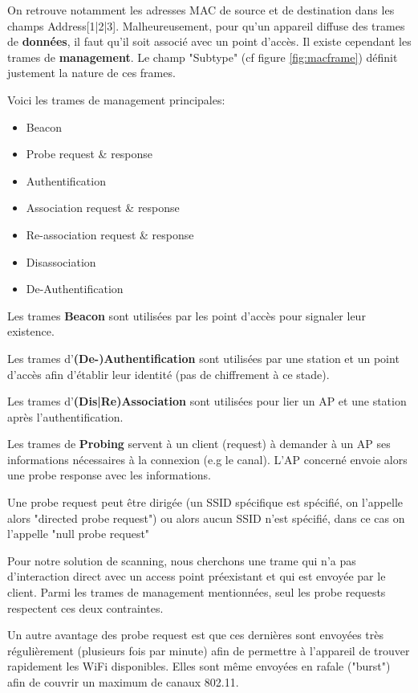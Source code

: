 On retrouve notamment les adresses MAC de source et de destination dans les champs Address[1|2|3].
Malheureusement, pour qu'un appareil diffuse des trames de \textbf{données}, il faut qu'il soit associé avec un point d'accès. 
Il existe cependant les trames de \textbf{management}. Le champ "Subtype" (cf figure \ref{fig:macframe}) définit justement
la nature de ces frames. 

Voici les trames de management principales:
\begin{itemize}
    \item Beacon
    \item Probe request \& response
    \item Authentification
    \item Association request \& response
    \item Re-association request \& response
    \item Disassociation
    \item De-Authentification
\end{itemize}

Les trames \textbf{Beacon} sont utilisées par les point d'accès pour signaler leur existence. 

Les trames d'\textbf{(De-)Authentification} sont utilisées par une station et un point d'accès afin d'établir leur identité (pas de chiffrement à ce stade).

Les trames d'\textbf{(Dis|Re)Association} sont utilisées pour lier un AP et une station après l'authentification.

Les trames de \textbf{Probing} servent à un client (request) à demander à un AP ses informations nécessaires à la connexion (e.g le canal).
L'AP concerné envoie alors une probe response avec les informations. 

Une probe request peut être dirigée (un SSID spécifique est spécifié, on l'appelle alors "directed probe request") ou alors aucun SSID n'est spécifié, dans ce cas
on l'appelle "null probe request"

Pour notre solution de scanning, nous cherchons une trame qui n'a pas d'interaction direct avec un access point préexistant
et qui est envoyée par le client. Parmi les trames de management mentionnées, seul les probe requests respectent ces deux contraintes.

Un autre avantage des probe request est que ces dernières sont envoyées très régulièrement (plusieurs fois par minute)
afin de permettre à l'appareil de trouver rapidement les WiFi disponibles. Elles sont même envoyées en rafale ("burst") afin de couvrir
un maximum de canaux 802.11.

